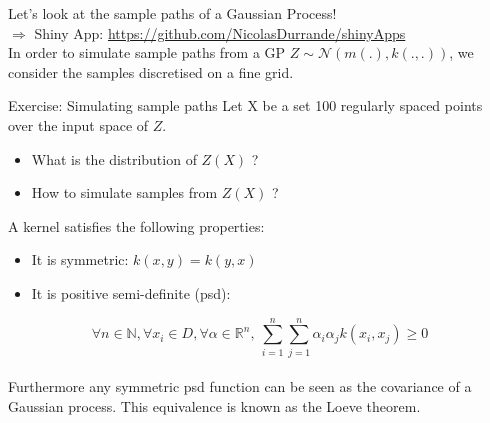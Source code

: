 \documentclass{beamer}
\begin{document}
\begin{frame}{}
Let's look at the sample paths of a Gaussian Process!\\
\vspace{2mm}
\alert{$\Rightarrow$ Shiny App:} \url{https://github.com/NicolasDurrande/shinyApps} \\
\vspace{5mm}
In order to simulate sample paths from a GP $Z \sim \mathcal{N}(m(.),k(.,.))$, we consider the samples discretised on a fine grid.
\vspace{5mm}
\begin{exampleblock}{Exercise: Simulating sample paths}
Let X be a set 100 regularly spaced points over the input space of $Z$.
\begin{itemize}
	\item What is the distribution of $Z(X)$ ?
	\item How to simulate samples from $Z(X)$ ?
\end{itemize}
\end{exampleblock}
\end{frame}

\begin{frame}{}
A kernel satisfies the following properties:
\begin{itemize}
	\item It is symmetric: $k(x,y) = k(y,x)$
	\item It is positive semi-definite (psd):
\end{itemize}
\begin{equation*}
	\forall n \in \mathds{N}, \forall x_i \in D, \forall \alpha \in \mathds{R}^n,\  \sum_{i=1}^n \sum_{j=1}^n \alpha_i \alpha_j k(x_i,x_j) \geq 0
\end{equation*}
\vspace{5mm} \\
Furthermore any symmetric psd function can be seen as the covariance of a Gaussian process. This equivalence is known as the Loeve theorem.
\end{frame}
\end{document}
